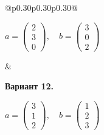\documentclass[12pt,a4paper]{article}
\begin{document}
{\begin{longtable}{@{}p{0.30\textwidth}p{0.30\textwidth}p{0.30\textwidth}@{}}
\begin{minipage}[t]{\linewidth}
\(\displaystyle  a=\begin{pmatrix}2\\3\\0\end{pmatrix},\quad b=\begin{pmatrix}3\\0\\2\end{pmatrix}\)\par
\end{minipage} &
\begin{minipage}[t]{\linewidth}\vspace{0pt}\raggedright\setlength{\parskip}{0pt}
\textbf{Вариант 12.}\par\smallskip
\(\displaystyle  a=\begin{pmatrix}3\\1\\2\end{pmatrix},\quad b=\begin{pmatrix}1\\2\\3\end{pmatrix}\)\par
\end{minipage}\\\noalign{\vskip 14pt}
\end{longtable}
}
\end{document}
